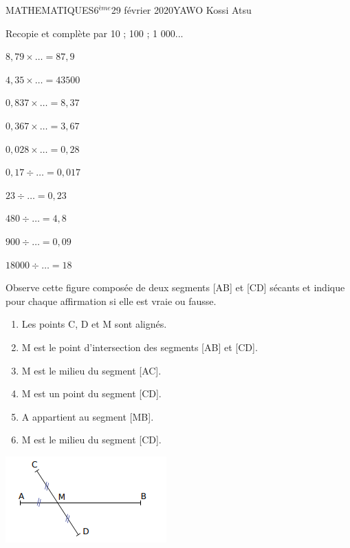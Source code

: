 \documentclass[12pt,a4paper]{book}
\newcommand{\prof}{YAWO Kossi Atsu}
\newcommand{\matiere}{MATHEMATIQUES}
\newcommand{\classe}{6$^{ème}$}
\begin{document}
\begin{td}{\matiere}{\classe}{29 février 2020}{\prof}
\vspace{0.5cm}

\begin{exo}
Recopie et complète par 10 ; 100 ; 1 000...
\begin{enumerate}
\begin{multicols}{2}
\item $8,79 \times \ldots = 87,9$
\item $4,35 \times \ldots = 43 500$
\item $0,837 \times \ldots = 8,37$
\item $0,367 \times \ldots = 3,67$
\item $0,028 \times \ldots = 0,28$
\item $0,17 \div \ldots= 0,017$
\item $23 \div \ldots = 0,23$
\item $480 \div \ldots = 4,8$
\item $900 \div \ldots = 0,09$
\item $18 000 \div \ldots = 18$
\end{multicols}
\end{enumerate}
\end{exo}

\begin{exo}
\setlength{\columnseprule}{1pt}
\begin{multicols}{2}
Observe cette figure composée de deux segments [AB] et [CD] sécants et indique pour chaque affirmation si elle est vraie ou fausse.
\begin{enumerate}
\item Les points C, D et M sont alignés.
\item M est le point d'intersection des segments [AB] et [CD].
\item M est le milieu du segment [AC].
\item M est un point du segment [CD].
\item A appartient au segment [MB].
\item M est le milieu du segment [CD].
\end{enumerate}
\includegraphics[scale=0.9]{images/td_29_02_20_img2.png}
\end{multicols}
\end{exo}
\end{td}
\end{document}
